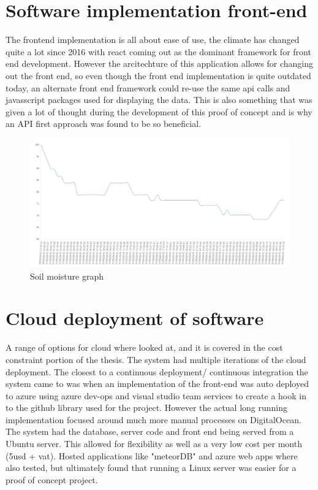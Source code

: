 \documentclass[]{uiophd}
\begin{document}
\section{Software implementation front-end}
The frontend implementation is all about ease of use, the climate has changed quite a lot since 2016 with react coming out as the dominant framework for front end development. However the arcitechture of this application allows for changing out the front end, so even though the front end implementation is quite outdated today, an alternate front end framework could re-use the same api calls and javasscript packages used for displaying the data. This is also something that was given a lot of thought during the development of this proof of concept and is why an API first approach was found to be so beneficial. 

 \begin{figure}[h]
\caption{Soil moisture graph}
\centering
\includegraphics[width=12cm]{watergraph.png}
\end{figure}

\section{Cloud deployment of software}
A range of options for cloud where looked at, and it is covered in the cost constraint portion of the thesis. The system had multiple iterations of the cloud deployment. The closest to a continuous deployment/ continuous integration the system came to was when an implementation of the front-end was auto deployed to azure using azure dev-ops and visual studio team services to create a hook in to the github library used for the project. However the actual long running implementation focused around much more manual processes on DigitalOcean. The system had the database, server code and front end being served from a Ubuntu server. This allowed for flexibility as well as a very low cost per month (5usd + vat). Hosted applications like "meteorDB" and azure web apps where also tested, but ultimately found that running a Linux server was easier for a proof of concept project.
\end{document}
